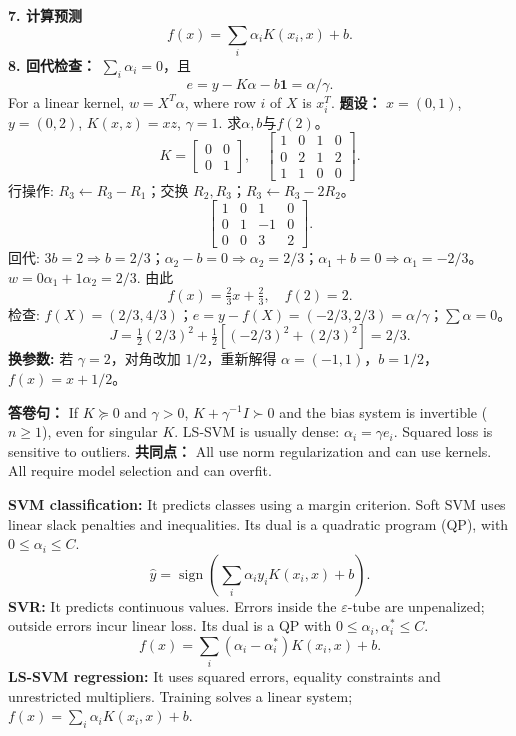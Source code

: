 \textbf{7. 计算预测}
\[\boxed{f(x)=\sum_i\alpha_iK(x_i,x)+b.}\]
\textbf{8. 回代检查：} $\sum_i\alpha_i=0$，且
\[e=y-K\alpha-b\mathbf1=\alpha/\gamma.\]
For a linear kernel, $w=X^T\alpha$, where row $i$ of $X$ is $x_i^T$.
\columnend\sepcol
\columnstart
{}
\textbf{题设：} $x=(0,1)$, $y=(0,2)$, $K(x,z)=xz$, $\gamma=1$. 求$\alpha,b$与$f(2)$。
\[K=\begin{bmatrix}0&0\\0&1\end{bmatrix},\quad
\left[\begin{array}{ccc|c}1&0&1&0\\0&2&1&2\\1&1&0&0\end{array}\right].\]
行操作: $R_3\leftarrow R_3-R_1$；交换 $R_2,R_3$；$R_3\leftarrow R_3-2R_2$。
\[\left[\begin{array}{ccc|c}1&0&1&0\\0&1&-1&0\\0&0&3&2\end{array}\right].\]
回代: $3b=2\Rightarrow b=2/3$；$\alpha_2-b=0\Rightarrow\alpha_2=2/3$；$\alpha_1+b=0\Rightarrow\alpha_1=-2/3$。
$w=0\alpha_1+1\alpha_2=2/3$. 由此
\[\boxed{f(x)=\tfrac23x+\tfrac23,\quad f(2)=2.}\]
检查: $f(X)=(2/3,4/3)$；$e=y-f(X)=(-2/3,2/3)=\alpha/\gamma$；$\sum\alpha=0$。
\[J=\tfrac12(2/3)^2+\tfrac12[(-2/3)^2+(2/3)^2]=2/3.\]
\textbf{换参数:} 若 $\gamma=2$，对角改加 $1/2$，重新解得 $\alpha=(-1,1)$，$b=1/2$，$f(x)=x+1/2$。

\textbf{答卷句：} If $K\succeq0$ and $\gamma>0$, $K+\gamma^{-1}I\succ0$ and the bias system is invertible ($n\ge1$), even for singular $K$. LS-SVM is usually dense: $\alpha_i=\gamma e_i$. Squared loss is sensitive to outliers.
\textbf{共同点：} All use norm regularization and can use kernels. All require model selection and can overfit.

\textbf{SVM classification:} It predicts classes using a margin criterion. Soft SVM uses linear slack penalties and inequalities. Its dual is a quadratic program (QP), with $0\le\alpha_i\le C$.
\[\hat y=\operatorname{sign}\!\left(\sum_i\alpha_i y_iK(x_i,x)+b\right).\]
\textbf{SVR:} It predicts continuous values. Errors inside the $\varepsilon$-tube are unpenalized; outside errors incur linear loss. Its dual is a QP with $0\le\alpha_i,\alpha_i^*\le C$.
\[f(x)=\sum_i(\alpha_i-\alpha_i^*)K(x_i,x)+b.\]
\textbf{LS-SVM regression:} It uses squared errors, equality constraints and unrestricted multipliers. Training solves a linear system; $f(x)=\sum_i\alpha_iK(x_i,x)+b$.

